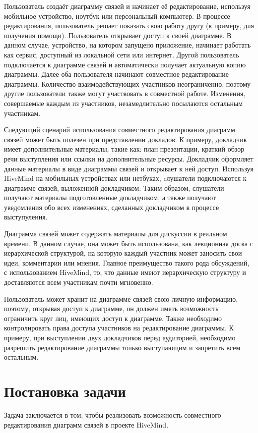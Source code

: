 Пользователь создаёт диаграмму связей и начинает её редактирование, используя
мобильное устройство, ноутбук или персональный компьютер. В процессе
редактирования, пользователь решает показать свою работу другу (к примеру, для
получения помощи). Пользователь открывает доступ к своей диаграмме. В данном
случае, устройство, на котором запущено приложение, начинает работать как
сервис, доступный из локальной сети или интернет. Другой пользователь
подключается к диаграмме связей и автоматически получает актуальную копию
диаграммы. Далее оба пользователя начинают совместное редактирование диаграммы.
Количество взаимодействующих участников неограниченно, поэтому другие
пользователи также могут участвовать в совместной работе. Изменения, совершаемые
каждым из участников, незамедлительно посылаются остальным участникам.

Следующий сценарий использования совместного редактирования диаграмм связей
может быть полезен при представлении докладов. К примеру, докладчик имеет
дополнительные материалы, такие как: план презентации, краткий обзор речи
выступления или ссылки на дополнительные ресурсы. Докладчик оформляет данные
материалы в виде диаграммы связей и открывает к ней доступ. Используя HiveMind
на мобильных устройствах или нетбуках, cлушатели подключаются к диаграмме
связей, выложенной докладчиком. Таким образом, слушатели получают материалы
подготовленные докладчиком, а также получают уведомления обо всех изменениях,
сделанных докладчиком в процессе выступуления.

Диаграмма связей может содержать материалы для дискуссии в реальном времени. В
данном случае, она может быть использована, как лекционная доска с иерархической
структурой, на которую каждый участник может заносить свои идеи, комментарии или
мнения. Главное преимущество такого рода обсуждений, с использованием HiveMind,
то, что данные имеют иерархическую структуру и доставляются всем участникам
почти мгновенно.

Пользователь может хранит на диаграмме связей свою личную информацию, поэтому,
открывая доступ к диаграмме, он должен иметь возможность ограничить круг
лиц, имеющих доступ к диаграмме. Также необходимо контролировать права доступа
участников на редактирование диаграммы. К примеру, при выступлении двух
докладчиков перед аудиторией, необходимо разрешить редактирование диаграммы
только выступающим и запретить всем остальным.


\section{Постановка задачи}
\label{sec:problem_statement}
Задача заключается в том, чтобы реализовать возможность совместного
редактирования диаграмм связей в проекте HiveMind.


